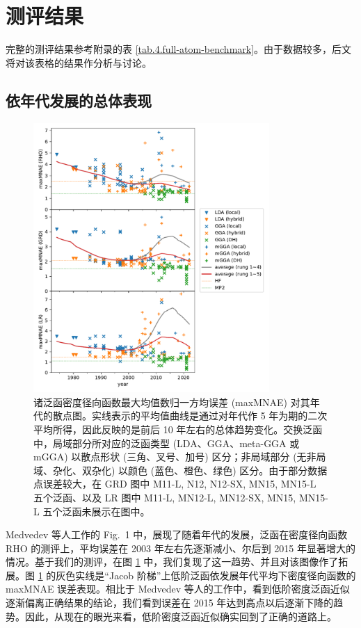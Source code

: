 \section{测评结果}

完整的测评结果参考附录的表 \ref{tab.4.full-atom-benchmark}。由于数据较多，后文将对该表格的结果作分析与讨论。

\subsection{依年代发展的总体表现}

\begin{figure}[!t]
    \centering
    \includegraphics[width=0.8\textwidth]{assets/maxMNAE-against-year.pdf}
    \caption[径向函数 maxMNAE 对年代的散点图]{诸泛函密度径向函数最大均值数归一方均误差 (maxMNAE) 对其年代的散点图。实线表示的平均值曲线是通过对年代作 5 年为期的二次平均所得，因此反映的是前后 10 年左右的总体趋势变化。交换泛函中，局域部分所对应的泛函类型 (LDA、GGA、meta-GGA 或 mGGA) 以散点形状 (三角、叉号、加号) 区分；非局域部分 (无非局域、杂化、双杂化) 以颜色 (蓝色、橙色、绿色) 区分。由于部分数据点误差较大，在 GRD 图中 M11-L, N12, N12-SX, MN15, MN15-L 五个泛函、以及 LR 图中 M11-L, MN12-L, MN12-SX, MN15, MN15-L 五个泛函未展示在图中。}
    \label{fig.4.maxMNAE-against-year}
\end{figure}

Medvedev 等人工作的 Fig.\ 1 中，展现了随着年代的发展，泛函在密度径向函数 RHO 的测评上，平均误差在 2003 年左右先逐渐减小、尔后到 2015 年显著增大的情况。基于我们的测评，在图 \ref{fig.4.maxMNAE-against-year} 中，我们复现了这一趋势、并且对该图像作了拓展。图 \ref{fig.4.maxMNAE-against-year} 的灰色实线是“Jacob 阶梯”上低阶泛函依发展年代平均下密度径向函数的 maxMNAE 误差表现。相比于 Medvedev 等人的工作中，看到低阶密度泛函近似逐渐偏离正确结果的结论，我们看到误差在 2015 年达到高点以后逐渐下降的趋势。因此，从现在的眼光来看，低阶密度泛函近似确实回到了正确的道路上。


